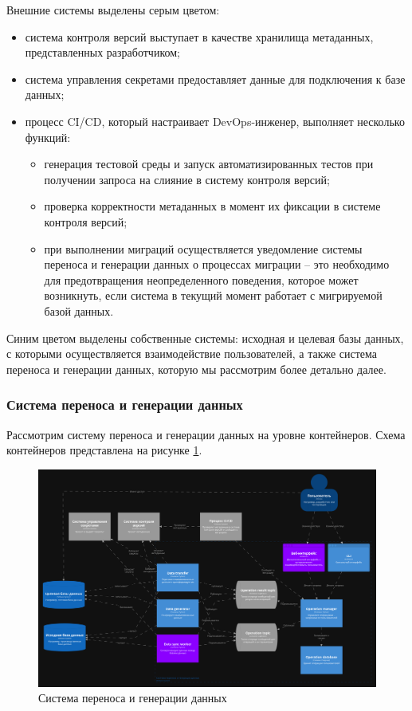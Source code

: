 Внешние системы выделены серым цветом:
\begin{itemize}
\item система контроля версий выступает в качестве хранилища метаданных, представленных разработчиком;
\item система управления секретами предоставляет данные для подключения к базе данных;
\item процесс CI/CD, который настраивает DevOps-инженер, выполняет несколько функций:
  \begin{itemize}
    \item генерация тестовой среды и запуск автоматизированных тестов при получении запроса на слияние в систему контроля версий;
    \item проверка корректности метаданных в момент их фиксации в системе контроля версий;
    \item при выполнении миграций осуществляется уведомление системы переноса и генерации данных о процессах миграции -- это необходимо для предотвращения неопределенного поведения, которое может возникнуть, если система в текущий момент работает с мигрируемой базой данных.
  \end{itemize}
\end{itemize}

Синим цветом выделены собственные системы: исходная и целевая базы данных, с которыми осуществляется взаимодействие пользователей, а также система переноса и генерации данных, которую мы рассмотрим более детально далее.

\subsubsection{Система переноса и генерации данных}

Рассмотрим систему переноса и генерации данных на уровне контейнеров. Схема контейнеров представлена на рисунке \ref{Containers}.

\begin{figure}
  \includegraphics[scale=0.12]{./img/structurizr-Containers.png}
  \caption{Система переноса и генерации данных}
  \label{Containers}
\end{figure}

